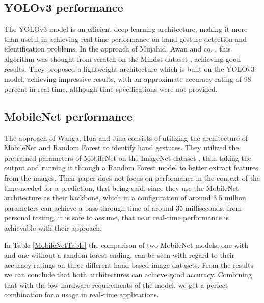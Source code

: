 \subsection{YOLOv3 performance}
\label{subsec:preformancesec1subsec2}

\par The YOLOv3 model is an efficient deep learning architecture, making it more than useful in achieving real-time performance on hand gesture detection and identification problems. In the approach of Mujahid, Awan and co. \cite{app11094164}, this algorithm was thought from scratch on the Mindst dataset \cite{deng2012mnist}, achieving good results. They proposed a lightweight architecture which is built on the YOLOv3 model, achieving impressive results, with an approximate accuracy rating of 98 percent in real-time, although time specifications were not provided.

\subsection{MobileNet performance}
\label{subsec:preformancesec1subsec3}

\par The approach of Wanga, Hua and Jina \cite{wang2021} consists of utilizing the architecture of MobileNet and Random Forest to identify hand gestures. They utilized the pretrained parameters of MobileNet on the ImageNet dataset \cite{deng2009imagenet}, than taking the output and running it through a Random Forest model to better extract features from the images. Their paper does not focus on performance in the context of the time needed for a prediction, that being said, since they use the MobileNet architecture as their backbone, which in a configuration of around 3.5 million parameters can achieve a pass-through time of around 35 milliseconds, from personal testing, it is safe to assume, that near real-time performance is achievable with their approach.
\par In Table \ref{MobileNetTable} the comparison of two MobileNet models, one with and one without a random forest ending, can be seen with regard to their accuracy ratings on three different hand based image datasets. From the results we can conclude that both architectures can achieve good accuracy. Combining that with the low hardware requirements of the model, we get a perfect combination for a usage in real-time applications.


